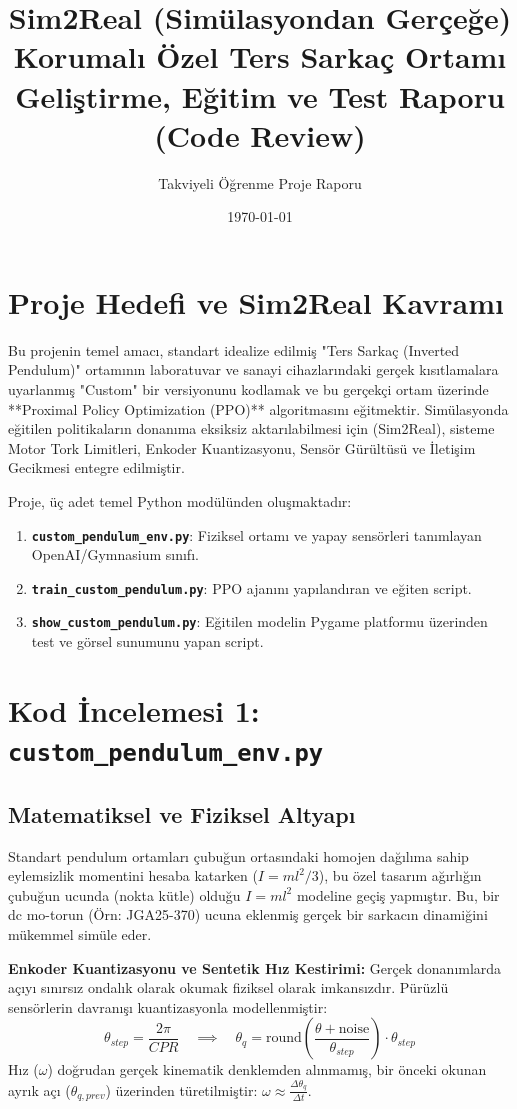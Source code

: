 \documentclass[12pt,a4paper]{article}
\title{Sim2Real (Simülasyondan Gerçeğe) Korumalı Özel Ters Sarkaç Ortamı \\
\large Geliştirme, Eğitim ve Test Raporu (Code Review)}
\author{Takviyeli Öğrenme Proje Raporu}
\date{\today}
\begin{document}
\maketitle
\tableofcontents
\newpage

\section{Proje Hedefi ve Sim2Real Kavramı}
Bu projenin temel amacı, standart idealize edilmiş "Ters Sarkaç (Inverted Pendulum)" ortamının laboratuvar ve sanayi cihazlarındaki gerçek kısıtlamalara uyarlanmış "Custom" bir versiyonunu kodlamak ve bu gerçekçi ortam üzerinde **Proximal Policy Optimization (PPO)** algoritmasını eğitmektir. Simülasyonda eğitilen politikaların donanıma eksiksiz aktarılabilmesi için (Sim2Real), sisteme Motor Tork Limitleri, Enkoder Kuantizasyonu, Sensör Gürültüsü ve İletişim Gecikmesi entegre edilmiştir.

Proje, üç adet temel Python modülünden oluşmaktadır:
\begin{enumerate}
    \item \textbf{\texttt{custom\_pendulum\_env.py}}: Fiziksel ortamı ve yapay sensörleri tanımlayan OpenAI/Gymnasium sınıfı.
    \item \textbf{\texttt{train\_custom\_pendulum.py}}: PPO ajanını yapılandıran ve eğiten script.
    \item \textbf{\texttt{show\_custom\_pendulum.py}}: Eğitilen modelin Pygame platformu üzerinden test ve görsel sunumunu yapan script.
\end{enumerate}

\newpage
\section{Kod İncelemesi 1: \texttt{custom\_pendulum\_env.py}}
\subsection{Matematiksel ve Fiziksel Altyapı}
Standart pendulum ortamları çubuğun ortasındaki homojen dağılıma sahip eylemsizlik momentini hesaba katarken ($I = ml^2/3$), bu özel tasarım ağırlığın çubuğun ucunda (nokta kütle) olduğu $I = ml^2$ modeline geçiş yapmıştır. Bu, bir dc mo-torun (Örn: JGA25-370) ucuna eklenmiş gerçek bir sarkacın dinamiğini mükemmel simüle eder.

\textbf{Enkoder Kuantizasyonu ve Sentetik Hız Kestirimi:} Gerçek donanımlarda açıyı sınırsız ondalık olarak okumak fiziksel olarak imkansızdır. Pürüzlü sensörlerin davranışı kuantizasyonla modellenmiştir:
\begin{equation}
    \theta_{step} = \frac{2\pi}{CPR} \quad \implies \quad \theta_q = \text{round}\left( \frac{\theta + \text{noise}}{\theta_{step}} \right) \cdot \theta_{step}
\end{equation}
Hız (\(\omega\)) doğrudan gerçek kinematik denklemden alınmamış, bir önceki okunan ayrık açı (\(\theta_{q, prev}\)) üzerinden türetilmiştir: $\omega \approx \frac{\Delta \theta_q}{\Delta t}$.
\end{document}
